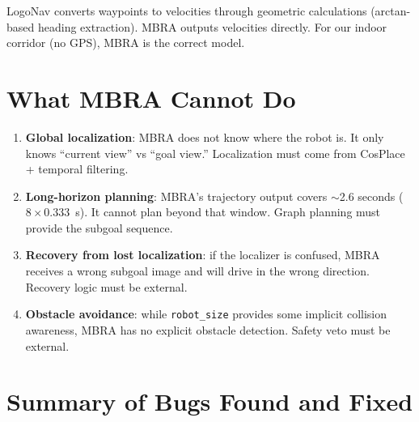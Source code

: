 \documentclass[11pt,a4paper]{article}
\begin{document}
LogoNav converts waypoints to velocities through geometric calculations
(arctan-based heading extraction).  MBRA outputs velocities directly.  For our
indoor corridor (no GPS), MBRA is the correct model.

\section{What MBRA Cannot Do}

\begin{enumerate}[nosep]
  \item \textbf{Global localization}: MBRA does not know where the robot is.
    It only knows ``current view'' vs ``goal view.''  Localization must come
    from CosPlace + temporal filtering.
  \item \textbf{Long-horizon planning}: MBRA's trajectory output covers
    $\sim$2.6 seconds ($8 \times 0.333$~s).  It cannot plan beyond that
    window.  Graph planning must provide the subgoal sequence.
  \item \textbf{Recovery from lost localization}: if the localizer is confused,
    MBRA receives a wrong subgoal image and will drive in the wrong direction.
    Recovery logic must be external.
  \item \textbf{Obstacle avoidance}: while \texttt{robot\_size} provides some
    implicit collision awareness, MBRA has no explicit obstacle detection.
    Safety veto must be external.
\end{enumerate}

\section{Summary of Bugs Found and Fixed}
\end{document}
